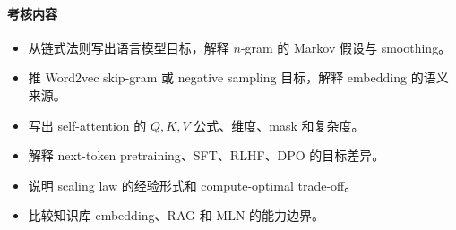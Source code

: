 \paragraph{考核内容}

\begin{itemize}
  \item 从链式法则写出语言模型目标，解释 \(n\)-gram 的 Markov 假设与 smoothing。
  \item 推 Word2vec skip-gram 或 negative sampling 目标，解释 embedding 的语义来源。
  \item 写出 self-attention 的 \(Q,K,V\) 公式、维度、mask 和复杂度。
  \item 解释 next-token pretraining、SFT、RLHF、DPO 的目标差异。
  \item 说明 scaling law 的经验形式和 compute-optimal trade-off。
  \item 比较知识库 embedding、RAG 和 MLN 的能力边界。
\end{itemize}

